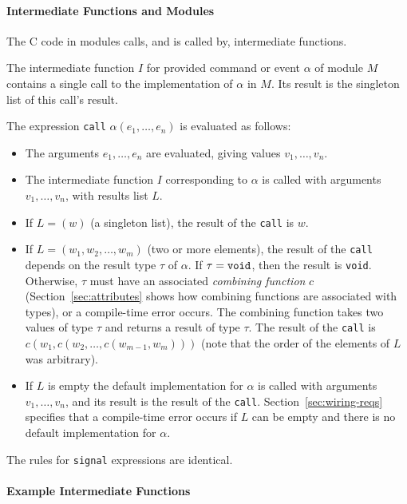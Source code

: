 \documentclass[11pt,letterpaper]{article}
\newcommand{\kw}[1]{{\tt #1}}
\newcommand{\code}[1]{{\tt #1}}
\begin{document}
\paragraph{Intermediate Functions and Modules}

The C code in modules calls, and is called by, intermediate functions. 

The intermediate function $I$ for provided command or event $\alpha$ of
module $M$ contains a single call to the implementation of $\alpha$ in
$M$. Its result is the singleton list of this call's result.

The expression \code{call} $\alpha(e_1, \ldots, e_n)$ is evaluated as
follows:
\begin{itemize}
\item The arguments $e_1, \ldots, e_n$ are evaluated, giving values $v_1,
\ldots, v_n$.

\item The intermediate function $I$ corresponding to $\alpha$ is called
with arguments $v_1, \ldots, v_n$, with results list $L$.

\item If $L = (w)$ (a singleton list), the result of the \code{call}
is $w$.

\item If $L = (w_1, w_2, \ldots, w_m)$ (two or more elements), the result
of the \code{call} depends on the result type $\tau$ of $\alpha$. If $\tau
= \kw{void}$, then the result is \kw{void}. Otherwise, $\tau$ must have an
associated \emph{combining function} $c$ (Section~\ref{sec:attributes}
shows how combining functions are associated with types), or a compile-time
error occurs. The combining function takes two values of type $\tau$ and
returns a result of type $\tau$. The result of the \kw{call} is $c(w_1,
c(w_2, \ldots, c(w_{m-1}, w_m)))$ (note that the order of the elements of 
$L$ was arbitrary).

\item If $L$ is empty the default implementation for $\alpha$ is
called with arguments $v_1, \ldots, v_n$, and its result is the result of
the \code{call}. Section~\ref{sec:wiring-reqs} specifies that a
compile-time error occurs if $L$ can be empty and there is no default
implementation for $\alpha$.
\end{itemize}
The rules for \code{signal} expressions are identical.

\paragraph{Example Intermediate Functions} 
\end{document}
